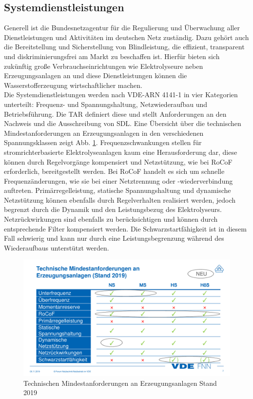 	\subsection{Systemdienstleistungen}
	Generell ist die Bundesnetzagentur für die Regulierung und Überwachung aller Dienstleistungen und Aktivitäten im deutschen Netz zuständig. Dazu gehört auch die Bereitstellung und Sicherstellung von Blindleistung, die effizient, transparent und diskriminierungsfrei am Markt zu beschaffen ist. Hierfür bieten sich zukünftig große Verbrauchseinrichtungen wie Elektrolyseure neben Erzeugungsanlagen an und diese Dienstleistungen können die Wasserstofferzeugung wirtschaftlicher machen.\\
	Die Systemdienstleistungen werden nach VDE-ARN 4141-1 in vier Kategorien unterteilt: Frequenz- und Spannungshaltung, Netzwiederaufbau und Betriebsführung. Die \gls{TAR} definiert diese und stellt Anforderungen an den Nachweis und die Ausschreibung von \gls{SDL}. Eine Übersicht über die technischen Mindestanforderungen an Erzeugungsanlagen in den verschiedenen Spannungsklassen zeigt Abb. \ref{fig:vde-fnn-tar}. Frequenzschwankungen stellen für stromrichterbasierte Elektrolyseanlagen kaum eine Herausforderung dar, diese können durch Regelvorgänge kompensiert und Netzstützung, wie bei \gls{RoCoF} erforderlich, bereitgestellt werden. Bei \gls{RoCoF} handelt es sich um schnelle Frequenzänderungen, wie sie bei einer Netztrennung oder -wiederverbindung auftreten. Primärregelleistung, statische Spannungshaltung und dynamische Netzstützung können ebenfalls durch Regelverhalten realisiert werden, jedoch begrenzt durch die Dynamik und den Leistungsbezug des Elektrolyseurs. Netzrückwirkungen sind ebenfalls zu berücksichtigen und können durch entsprechende Filter kompensiert werden. Die Schwarzstartfähigkeit ist in diesem Fall schwierig und kann nur durch eine Leistungsbegrenzung während des Wiederaufbaus unterstützt werden.
	\begin{figure}
		\centering
		\includegraphics[width=0.9\linewidth]{content/Grafiken/VDE-FNN-TAR}
		\caption[Technischen Mindestanforderungen an Erzeugungsanlagen Stand 2019]{Technischen Mindestanforderungen an Erzeugungsanlagen Stand 2019 \cite{VDEFNN2019SDL}}
		\label{fig:vde-fnn-tar}
	\end{figure}
	

